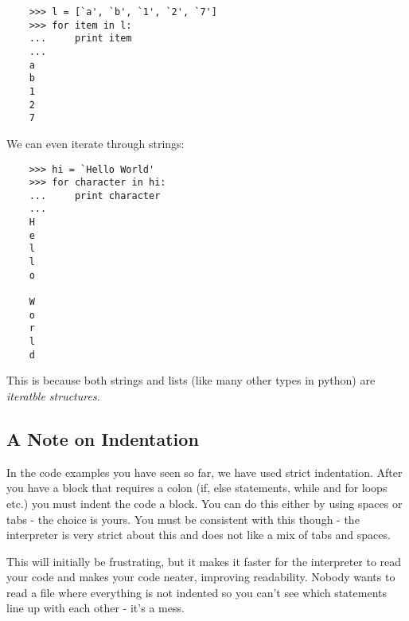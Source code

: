 \begin{lstlisting}
    >>> l = [`a', `b', `1', `2', `7']
    >>> for item in l:
    ...     print item
    ...
    a
    b
    1
    2
    7
\end{lstlisting}

We can even iterate through strings:

\begin{lstlisting}
    >>> hi = `Hello World'
    >>> for character in hi:
    ...     print character
    ...
    H
    e
    l
    l
    o

    W
    o
    r
    l
    d
\end{lstlisting}

This is because both strings and lists (like many other types in python) are
\emph{iteratble structures}.

\subsection{A Note on Indentation}

In the code examples you have seen so far, we have used strict indentation.
After you have a block that requires a colon (if, else statements, while and for
loops etc.) you must indent the code a block. You can do this either by using
spaces or tabs - the choice is yours. You must be consistent with this though - 
the interpreter is very strict about this and does not like a mix of tabs and
spaces.

This will initially be frustrating, but it makes it faster for the interpreter
to read your code and makes your code neater, improving readability. Nobody
wants to read a file where everything is not indented so you can't see which
statements line up with each other - it's a mess.

